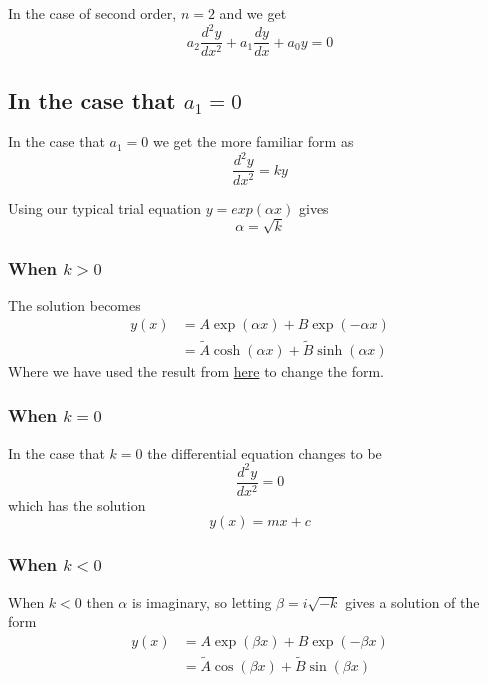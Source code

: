 \documentclass[a5paper,10pt]{book}
\begin{document}
In the case of second order, $n=2$ and we get
\begin{equation}
	a_2 \frac{d^2 y}{dx^2}+a_1\frac{dy}{dx}+ a_0 y = 0
\end{equation}

\subsection{In the case that $a_1=0$}
In the case that $a_1=0$ we get the more familiar form as
\begin{equation}
\frac{d^2 y}{dx^2}= k y 
\end{equation}

Using our typical trial equation $y=exp(\alpha x)$ gives
\begin{equation}
\alpha=\sqrt{k}
\end{equation}

\subsubsection{When $k>0$}
The solution becomes
\begin{align}
	y(x) &= A \exp(\alpha x)+B\exp(-\alpha x) \nonumber \\
	&= \tilde{A} \cosh(\alpha x) + \tilde{B} \sinh(\alpha x)
\end{align}
Where we have used the result from \href{../../Maths/ChangeOfBasisOfTypicalSolutions.md}{here} to change the form.

\subsubsection{When $k=0$}
In the case that $k=0$ the differential equation changes to be
\begin{equation}
	\frac{d^2 y}{dx^2}= 0 
\end{equation}
which has the solution
\begin{equation}
y(x)=mx+c
\end{equation}

\subsubsection{When $k<0$}
When $k<0$ then $\alpha$ is imaginary, so letting $\beta = i\sqrt{-k}$ gives a solution of the form
\begin{align}
	y(x) &= A \exp(\beta x)+B\exp(-\beta x) \nonumber \\
	&= \tilde{A} \cos(\beta x) + \tilde{B} \sin(\beta x)
\end{align}
\end{document}
